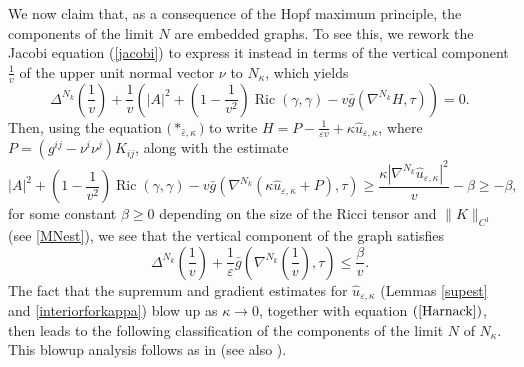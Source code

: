 \documentclass[11pt]{amsart}
\renewcommand{\epsilon}{\varepsilon}
\DeclareMathOperator{\Ric}{Ric}    \DeclareMathOperator{\Rm}{Rm}
\def\e{\epsilon}
\def\k{\kappa}
\begin{document}
We now claim that, as a consequence of the Hopf maximum principle,   the components of the limit $N$ are  embedded graphs. To see this, we rework the Jacobi equation (\ref{jacobi}) to express it instead in terms of the vertical component $\frac{1}{v}$ of the upper unit normal vector $\nu$ to $N_{\kappa}$, which yields
\begin{equation*}
\Delta^{N_k}\left(\frac{1}{v}\right)+\frac{1}{v}\left(|A|^2+\left(1-\frac{1}{v^2}\right)\Ric(\gamma,\gamma)-v\bar g\left(\nabla ^{N_k}H,\tau\right)\right)=0.
\end{equation*}
Then, using the equation  $({*_{\hat{\varepsilon},\kappa})}$ to write $H=P-\frac{1}{\e v}+\k\hat u_{\e, \k}$, where $P=(g^{ij}-\nu^i\nu^j)K_{ij}$, along with the estimate
\begin{equation*}
|A|^2+\left(1-\frac{1}{v^2}\right)\Ric(\gamma,\gamma)-v\bar g\left(\nabla^{N_k}(\kappa \hat{u}_{\e,\k}+P),\tau\right)\geq \frac{\kappa |\nabla^{N_k}\hat{u}_{\e,\k}|^2}{v}-\beta\geq-\beta,
\end{equation*}
for some constant $\beta\geq0$ depending on the size of the Ricci tensor and $\|K\|_{C^1}$ (see \eqref{MNest}), we see that the vertical component of the graph satisfies
\begin{equation}\label{Harnack}
\Delta^{N_k}\left(\frac{1}{v}\right)+\frac{1}{\varepsilon}\bar g\left(\nabla^{N_k} \left(\frac{1}{v}\right),\tau\right)\leq\frac{\beta}{v}.
\end{equation}
The fact that the supremum and gradient estimates for $\hat{u}_{\varepsilon,\kappa}$ (Lemmas \ref{supest} and \ref{interiorforkappa}) blow up as $\kappa\to0$, together with equation $(\ref{Harnack})$, then leads to the  following classification of the components of the limit $N$ of $N_{\kappa}$. This blowup analysis follows as in  \cite[Proposition 4]{SY81} (see also \cite{E09}). 
\end{document}
